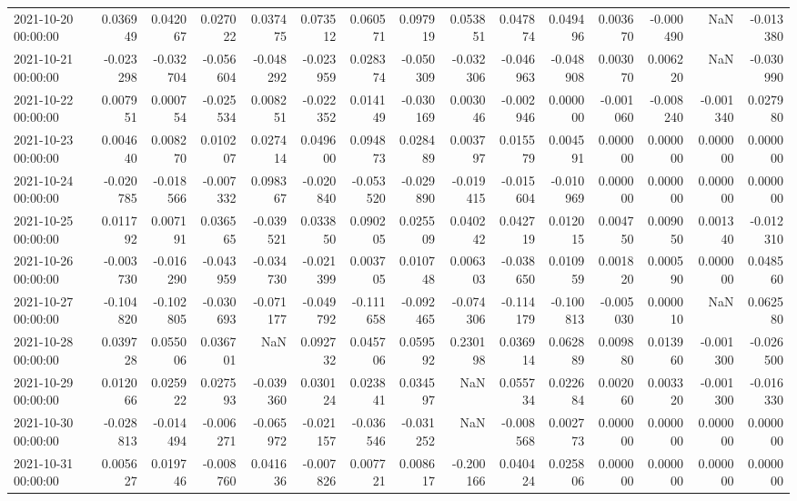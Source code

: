 \begin{tabular}{lrrrrrrrrrrrrrr}
2021-10-20 00:00:00 & 0.036949 & 0.042067 & 0.027022 & 0.037475 & 0.073512 & 0.060571 & 0.097919 & 0.053851 & 0.047874 & 0.049496 & 0.003670 & -0.000490 & NaN & -0.013380 \\
2021-10-21 00:00:00 & -0.023298 & -0.032704 & -0.056604 & -0.048292 & -0.023959 & 0.028374 & -0.050309 & -0.032306 & -0.046963 & -0.048908 & 0.003070 & 0.006220 & NaN & -0.030990 \\
2021-10-22 00:00:00 & 0.007951 & 0.000754 & -0.025534 & 0.008251 & -0.022352 & 0.014149 & -0.030169 & 0.003046 & -0.002946 & 0.000000 & -0.001060 & -0.008240 & -0.001340 & 0.027980 \\
2021-10-23 00:00:00 & 0.004640 & 0.008270 & 0.010207 & 0.027414 & 0.049600 & 0.094873 & 0.028489 & 0.003797 & 0.015579 & 0.004591 & 0.000000 & 0.000000 & 0.000000 & 0.000000 \\
2021-10-24 00:00:00 & -0.020785 & -0.018566 & -0.007332 & 0.098367 & -0.020840 & -0.053520 & -0.029890 & -0.019415 & -0.015604 & -0.010969 & 0.000000 & 0.000000 & 0.000000 & 0.000000 \\
2021-10-25 00:00:00 & 0.011792 & 0.007191 & 0.036565 & -0.039521 & 0.033850 & 0.090205 & 0.025509 & 0.040242 & 0.042719 & 0.012015 & 0.004750 & 0.009050 & 0.001340 & -0.012310 \\
2021-10-26 00:00:00 & -0.003730 & -0.016290 & -0.043959 & -0.034730 & -0.021399 & 0.003705 & 0.010748 & 0.006303 & -0.038650 & 0.010959 & 0.001820 & 0.000590 & 0.000000 & 0.048560 \\
2021-10-27 00:00:00 & -0.104820 & -0.102805 & -0.030693 & -0.071177 & -0.049792 & -0.111658 & -0.092465 & -0.074306 & -0.114179 & -0.100813 & -0.005030 & 0.000010 & NaN & 0.062580 \\
2021-10-28 00:00:00 & 0.039728 & 0.055006 & 0.036701 & NaN & 0.092732 & 0.045706 & 0.059592 & 0.230198 & 0.036914 & 0.062889 & 0.009880 & 0.013960 & -0.001300 & -0.026500 \\
2021-10-29 00:00:00 & 0.012066 & 0.025922 & 0.027593 & -0.039360 & 0.030124 & 0.023841 & 0.034597 & NaN & 0.055734 & 0.022684 & 0.002060 & 0.003320 & -0.001300 & -0.016330 \\
2021-10-30 00:00:00 & -0.028813 & -0.014494 & -0.006271 & -0.065972 & -0.021157 & -0.036546 & -0.031252 & NaN & -0.008568 & 0.002773 & 0.000000 & 0.000000 & 0.000000 & 0.000000 \\
2021-10-31 00:00:00 & 0.005627 & 0.019746 & -0.008760 & 0.041636 & -0.007826 & 0.007721 & 0.008617 & -0.200166 & 0.040424 & 0.025806 & 0.000000 & 0.000000 & 0.000000 & 0.000000 \\

\end{tabular}
